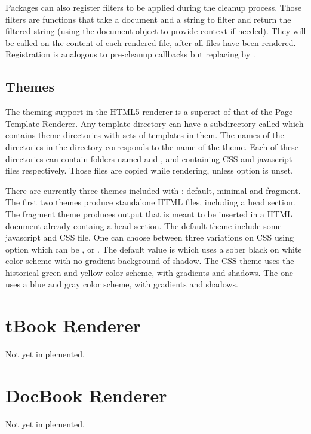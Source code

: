 Packages can also register filters to be applied during the cleanup
process. Those filters are functions that take a document and a string
to filter and return the filtered string (using the document object to
provide context if needed). They will be called on the content of each
rendered file, after all files have been rendered.  Registration is
analogous to pre-cleanup callbacks but replacing
 by .

\subsection{Themes}

The theming support in the HTML5 renderer is a superset of that of the
Page Template Renderer. Any template directory can have a subdirectory called
 which contains theme directories with sets of templates
in them.  The names of the directories in the  directory
corresponds to the name of the theme. Each of these directories can contain
folders named  and , and containing CSS and javascript files
respectively. Those files are copied while rendering, unless
option  is unset.

There are currently three themes included with \plasTeX: default, minimal and
fragment. The first two themes produce standalone HTML files, including a head
section. The fragment theme produces output that is meant to be inserted in a
HTML document already containg a head section. The default theme include some
javascript and CSS file. One can choose between three variations on CSS using
option  which can be ,  or
. The default value is  which uses a sober black on
white color scheme with no gradient background of shadow. The 
CSS theme uses the historical \plasTeX{} green and yellow color scheme, with
gradients and shadows. The  one uses a blue and gray color scheme,
with gradients and shadows.


\section{tBook Renderer}

Not yet implemented.

\section{DocBook Renderer}

Not yet implemented.
